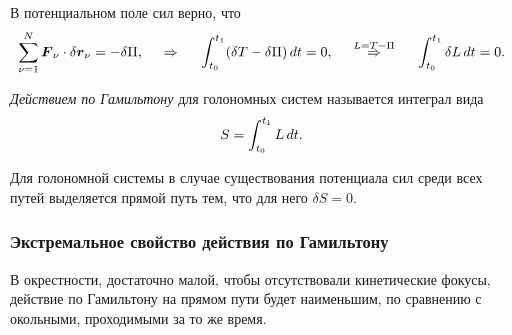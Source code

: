 В потенциальном поле сил верно, что
\begin{equation*}
    \sum_{\nu=1}^N \mbox{\boldmath $F$}_\nu \cdot \delta \mbox{\boldmath $r$}_\nu = - \delta \Pi,
    \hspace{0.5cm} \Rightarrow \hspace{0.5cm} 
    \int_{t_0}^{t_1} (\delta T - \delta \Pi) \, d t = 0,
    \hspace{0.5cm} \overset{L = T - \Pi}{\Rightarrow}  \hspace{0.5cm} 
    \int_{t_0}^{t_1} \delta L \, d t = 0.
\end{equation*}

\begin{to_def} 
    \textit{Действием по Гамильтону} для голономных систем называется интеграл вида
    \begin{equation*}
        S = \int_{t_0}^{t_1} L \, d t.
    \end{equation*}
\end{to_def}

\begin{to_thr}
     Для голономной системы в случае существования потенциала сил среди всех путей выделяется прямой путь тем, что для него $\delta S = 0$.
\end{to_thr}



\subsubsection*{Экстремальное свойство действия по Гамильтону}
\begin{to_thr}
    В окрестности, достаточно малой, чтобы отсутствовали кинетические фокусы, действие по Гамильтону на прямом пути будет наименьшим, по сравнению с окольными, проходимыми за то же время.
\end{to_thr}


